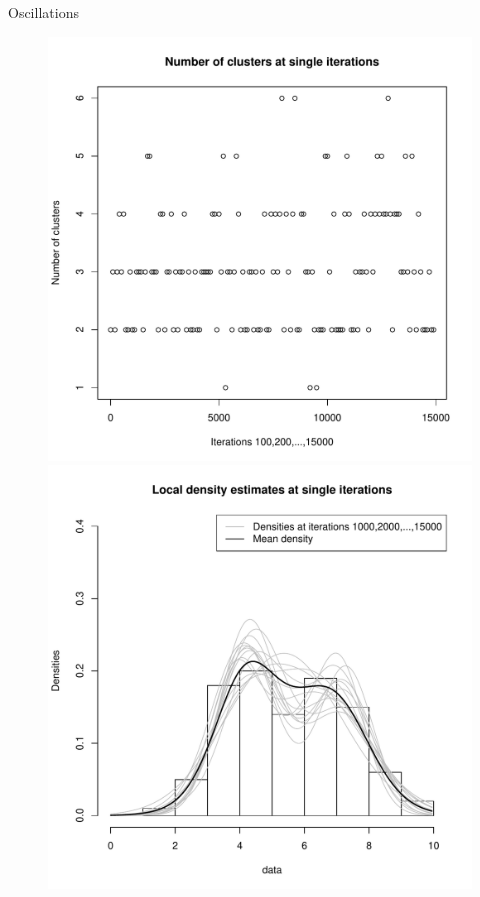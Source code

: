 \begin{frame}{Oscillations}
\begin{figure}[h]
	\centering
	\begin{minipage}{0.5\textwidth}
		\includegraphics[scale=0.35]{etc/cardinalities_thinned.pdf}
	\end{minipage}%
	\begin{minipage}{0.5\textwidth}
		\includegraphics[scale=0.35]{etc/densities_iters.pdf}
	\end{minipage}
\end{figure}

\end{frame}

